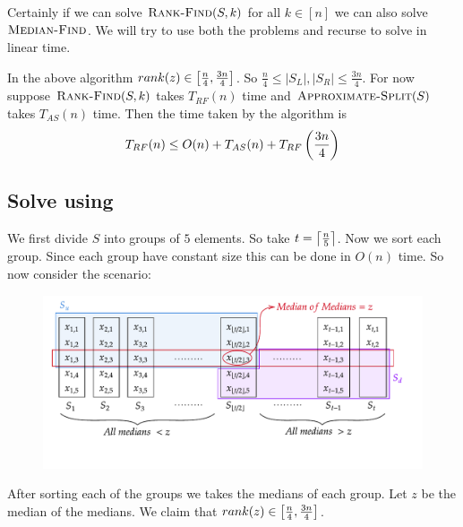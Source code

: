 Certainly if we can solve $\textsc{Rank-Find}(S,k)$ for all $k\in[n]$ we can also solve $\textsc{Median-Find}$. We will try to use both the problems and recurse to solve  in linear time.

In the above algorithm $rank(z)\in \left[\frac{n}{4},\frac{3n}{4}\right]$. So $\frac{n}4\leq |S_L|,|S_R|\leq \frac{3n}4$. For now suppose $\textsc{Rank-Find}(S,k)$ takes $T_{RF}(n)$ time and $\textsc{Approximate-Split}(S)$ takes $T_{AS}(n)$ time. Then the time taken by the algorithm is  $$T_{RF}(n)\leq O(n)+T_{AS}(n)+T_{RF}\left(\frac{3n}4\right)$$
\subsection{Solve  using }
We first divide $S$ into groups of $5$ elements. So take $t=\left\lceil\frac{n}5\right\rceil$. Now we sort each group. Since each group have constant size this can be done in $O(n)$ time. So now consider the scenario:
\begin{figure}[h]
	\centering
	\includegraphics{images/approx-split-using-rankfind}
\end{figure}

After sorting each of the groups we takes the medians of each group. Let $z$ be the median of the medians. We claim that $rank(z)\in  \left[\frac{n}{4},\frac{3n}{4}\right]$.

\begin{algorithm}
	\DontPrintSemicolon
	\caption{$(S)$}
\end{algorithm}

